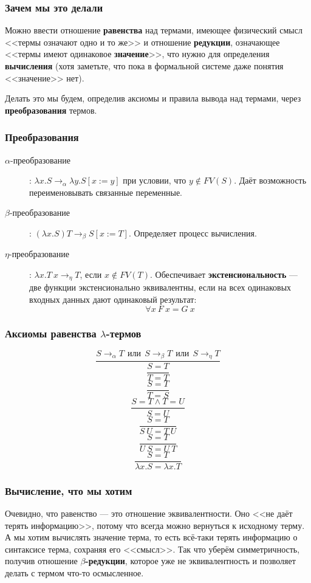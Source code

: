 \documentclass[xetex,mathserif,serif]{beamer}
\begin{document}
	\begin{frame}
		\frametitle{Зачем мы это делали}
		Можно ввести отношение \textbf{равенства} над термами, имеющее физический смысл 
		<<термы означают одно и то же>> и отношение \textbf{редукции}, означающее <<термы имеют 
		одинаковое \textbf{значение}>>, что нужно для определения \textbf{вычисления} (хотя заметьте, что пока в
		формальной системе даже понятия <<значение>> нет).
		
		Делать это мы будем, определив аксиомы и правила вывода над термами, через \textbf{преобразования}
		термов.
	\end{frame}
		
	\begin{frame}
		\frametitle{Преобразования}
		\begin{description}
			\item [$\alpha$-преобразование]: $\lambda x.S \rightarrow_\alpha 
					\lambda y.S[x := y]$ при условии, что $y \notin FV(S)$. 
					Даёт возможность переименовывать связанные переменные.
			\item [$\beta$-преобразование]: $(\lambda x.S) T \rightarrow_\beta S[x := T]$.
					Определяет процесс вычисления.
			\item [$\eta$-преобразование]: $\lambda x.T\ x \rightarrow_\eta T$, 
					если $x \notin FV(T)$. Обеспечивает	\textbf{экстенсиональность} 
					--- две функции экстенсионально эквивалентны, если на всех
					одинаковых входных данных дают одинаковый результат:
					$$\forall x\ F\ x = G\ x$$
		\end{description}
	\end{frame}

	\begin{frame}
		\frametitle{Аксиомы равенства $\lambda$-термов}
		$$\dfrac{S \rightarrow_\alpha T\ \ 
			\mbox{или}\ \ S \rightarrow_\beta T\ \ 
			\mbox{или}\ \  S \rightarrow_\eta T}{S = T}$$
		$$\dfrac{}{T = T}$$
		$$\dfrac{S = T}{T = S}$$
		$$\dfrac{S = T \wedge T = U}{S = U}$$
		$$\dfrac{S = T}{S\ U = T\ U}$$
		$$\dfrac{S = T}{U\ S = U\ T}$$
		$$\dfrac{S = T}{\lambda x.S = \lambda x.T}$$
	\end{frame}
	
	\begin{frame}
		\frametitle{Вычисление, что мы хотим}
		Очевидно, что равенство --- это отношение эквивалентности. Оно <<не даёт терять
		информацию>>, потому что всегда можно вернуться к исходному терму. А мы хотим 
		вычислять значение терма, то есть всё-таки терять информацию о синтаксисе 
		терма, сохраняя	его <<смысл>>. Так что уберём симметричность, получив 
		отношение \textbf{$\beta$-редукции}, которое уже не эквивалентность и позволяет 
		делать с термом что-то осмысленное.
	\end{frame}
\end{document}
